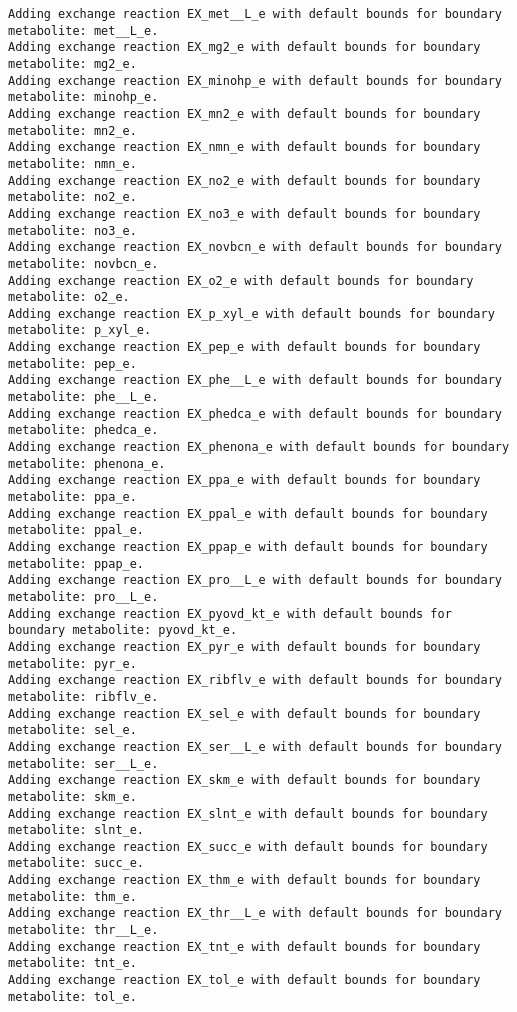 \documentclass[
  letterpaper,
  DIV=11,
  numbers=noendperiod]{scrartcl}
\begin{document}
\begin{verbatim}
Adding exchange reaction EX_met__L_e with default bounds for boundary metabolite: met__L_e.
Adding exchange reaction EX_mg2_e with default bounds for boundary metabolite: mg2_e.
Adding exchange reaction EX_minohp_e with default bounds for boundary metabolite: minohp_e.
Adding exchange reaction EX_mn2_e with default bounds for boundary metabolite: mn2_e.
Adding exchange reaction EX_nmn_e with default bounds for boundary metabolite: nmn_e.
Adding exchange reaction EX_no2_e with default bounds for boundary metabolite: no2_e.
Adding exchange reaction EX_no3_e with default bounds for boundary metabolite: no3_e.
Adding exchange reaction EX_novbcn_e with default bounds for boundary metabolite: novbcn_e.
Adding exchange reaction EX_o2_e with default bounds for boundary metabolite: o2_e.
Adding exchange reaction EX_p_xyl_e with default bounds for boundary metabolite: p_xyl_e.
Adding exchange reaction EX_pep_e with default bounds for boundary metabolite: pep_e.
Adding exchange reaction EX_phe__L_e with default bounds for boundary metabolite: phe__L_e.
Adding exchange reaction EX_phedca_e with default bounds for boundary metabolite: phedca_e.
Adding exchange reaction EX_phenona_e with default bounds for boundary metabolite: phenona_e.
Adding exchange reaction EX_ppa_e with default bounds for boundary metabolite: ppa_e.
Adding exchange reaction EX_ppal_e with default bounds for boundary metabolite: ppal_e.
Adding exchange reaction EX_ppap_e with default bounds for boundary metabolite: ppap_e.
Adding exchange reaction EX_pro__L_e with default bounds for boundary metabolite: pro__L_e.
Adding exchange reaction EX_pyovd_kt_e with default bounds for boundary metabolite: pyovd_kt_e.
Adding exchange reaction EX_pyr_e with default bounds for boundary metabolite: pyr_e.
Adding exchange reaction EX_ribflv_e with default bounds for boundary metabolite: ribflv_e.
Adding exchange reaction EX_sel_e with default bounds for boundary metabolite: sel_e.
Adding exchange reaction EX_ser__L_e with default bounds for boundary metabolite: ser__L_e.
Adding exchange reaction EX_skm_e with default bounds for boundary metabolite: skm_e.
Adding exchange reaction EX_slnt_e with default bounds for boundary metabolite: slnt_e.
Adding exchange reaction EX_succ_e with default bounds for boundary metabolite: succ_e.
Adding exchange reaction EX_thm_e with default bounds for boundary metabolite: thm_e.
Adding exchange reaction EX_thr__L_e with default bounds for boundary metabolite: thr__L_e.
Adding exchange reaction EX_tnt_e with default bounds for boundary metabolite: tnt_e.
Adding exchange reaction EX_tol_e with default bounds for boundary metabolite: tol_e.

\end{verbatim}
\end{document}

